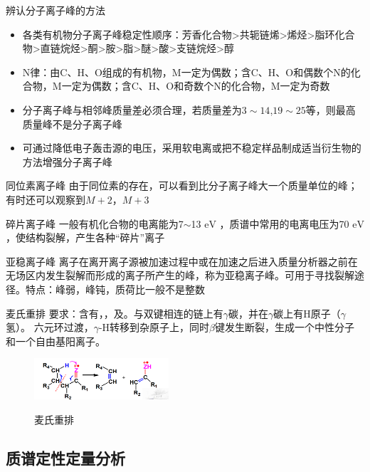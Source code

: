 \begin{note}
    辨认分子离子峰的方法
    \begin{itemize}
        \item 各类有机物分子离子峰稳定性顺序：芳香化合物>共轭链烯>烯烃>脂环化合物>直链烷烃>酮>胺>脂>醚>酸>支链烷烃>醇
        \item N律：由C、H、O组成的有机物，M一定为偶数；含C、H、O和偶数个N的化合物，M一定为偶数；含C、H、O和奇数个N的化合物，M一定为奇数
        \item 分子离子峰与相邻峰质量差必须合理，若质量差为$3\sim 14$,$19\sim 25$等，则最高质量峰不是分子离子峰
        \item 可通过降低电子轰击源的电压，采用软电离或把不稳定样品制成适当衍生物的方法增强分子离子峰
    \end{itemize}
\end{note}
 \begin{definition*}{同位素离子峰}
    由于同位素的存在，可以看到比分子离子峰大一个质量单位的峰；有时还可以观察到$M+2$，$M+3$
 \end{definition*}
 \begin{definition*}{ 碎片离子峰}
   一般有机化合物的电离能为7$\sim$13 $\mathrm{eV}$ ，质谱中常用的电离电压为70 $\mathrm{eV}$，使结构裂解，产生各种“碎片”离子
 \end{definition*}
 \begin{definition*}{亚稳离子峰}
    离子在离开离子源被加速过程中或在加速之后进入质量分析器之前在无场区内发生裂解而形成的离子所产生的峰，称为亚稳离子峰。可用于寻找裂解途径。特点：峰弱，峰钝，质荷比一般不是整数
 \end{definition*}
\begin{theorem*}{麦氏重排}
    要求：含有，，及。与双键相连的链上有$\gamma$碳，并在$\gamma$碳上有H原子（$\gamma$氢）。
六元环过渡，$\gamma$-H转移到杂原子上，同时$\beta$键发生断裂，生成一个中性分子和一个自由基阳离子。

\end{theorem*}
\begin{figure}[ht]
    \centering
    \includegraphics[width=5cm]{image/chp2_m_reform.png}
    \label{fig:chp2_reform}
    \caption[]{麦氏重排}
\end{figure}



\subsection{质谱定性定量分析}
